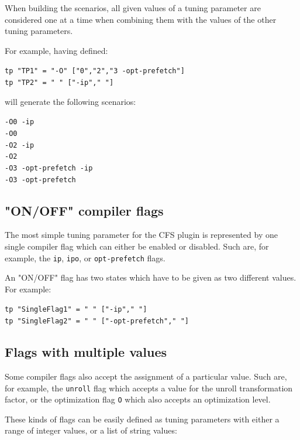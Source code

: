 \documentclass[11pt,a4paper, oneside]{book} %
\newenvironment{code}%
{
\addtolength{\leftskip}{0.5cm}}%
{

}
\begin{document}
When building the scenarios, all given values of a tuning parameter are considered one at a time when combining them with the values of the other tuning parameters.

For example, having defined:

\begin{code}
\texttt{tp "TP1" = "-O" ["0","2","3 -opt-prefetch"]}\\
\texttt{tp "TP2" = " " ["-ip"," "]}
\end{code}

will generate the following scenarios:

\begin{code}
\texttt{-O0 -ip}\\
\texttt{-O0}\\
\texttt{-O2 -ip}\\
\texttt{-O2}\\
\texttt{-O3 -opt-prefetch -ip}\\
\texttt{-O3 -opt-prefetch}
\end{code}


\subsection{"ON/OFF" compiler flags}
The most simple tuning parameter for the CFS plugin is represented by one single compiler flag which can either be enabled or disabled. Such are, for example, the \texttt{ip}, \texttt{ipo}, or \texttt{opt-prefetch} flags.

An "ON/OFF" flag has two states which have to be given as two different values. For example:

\begin{code}
\texttt{tp "SingleFlag1" = " " ["-ip"," "]}\\
\texttt{tp "SingleFlag2" = " " ["-opt-prefetch"," "]}
\end{code}

\subsection{Flags with multiple values}
Some compiler flags also accept the assignment of a particular value. Such are, for example, the \texttt{unroll} flag which accepts a value for the unroll transformation factor, or the optimization flag \texttt{O} which also accepts an optimization level.

These kinds of flags can be easily defined as tuning parameters with either a range of integer values, or a list of string values:
\end{document}
